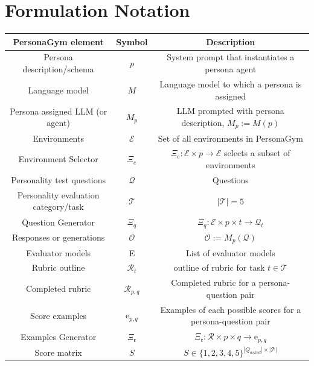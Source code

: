 \documentclass[11pt]{article}
\newcommand{\benchmark}{PersonaGym\xspace}
\begin{document}
\clearpage


\begin{minipage}{\textwidth}
    \section{Formulation Notation}
    \vspace{20pt}
    \centering
    \small
    \renewcommand{\arraystretch}{1.5} 
    \begin{tabular}{|c|c|c|} \hline
       \benchmark element  & Symbol & Description \\ \hline
        Persona description/schema & $p$ & System prompt that instantiates a persona agent \\
        Language model & $M$ & Language model to which a persona is assigned \\
        Persona assigned LLM (or agent) & $M_p$ & LLM prompted with persona description, $M_p := M(p)$ \\
        Environments & $\mathcal{E}$ & Set of all environments in \benchmark \\
        Environment Selector & $\Xi_e$ & $\Xi_e: \mathcal{E} \times p \to \mathcal{E}$ selects a subset of environments 
        \\
        Personality test questions & $\mathcal{Q}$ & Questions \\
        Personality evaluation category/task & $\mathcal{T}$ & $|\mathcal{T}| = 5$\\
        Question Generator & $\Xi_q$ & $\Xi_q: \mathcal{E} \times p \times t \to \mathcal{Q}_t$\\
        Responses or generations & $\mathcal{O}$ & $\mathcal{O} := M_p(\mathcal{Q})$\\
        Evaluator models & E & List of evaluator models\\
        Rubric outline & $\mathcal{R}_t$ & outline of rubric for task $t \in \mathcal{T}$\\
        Completed rubric & $\mathcal{R}_{p,q}$ & Completed rubric for a persona-question pair\\
        Score examples & $\mathrm{e}_{p,q}$ & Examples of each possible scores for a persona-question pair\\
        Examples Generator & $\Xi_{\mathfrak{r}}$ & $\Xi_{\mathfrak{r}}: \mathcal{R} \times p \times q \to \mathrm{e}_{p,q}$\\
        Score matrix & $S$ &  $S \in \{1,2,3,4,5\}^{|Q_{asked}| \times |\mathcal{T}|}$\\
    \hline
    \end{tabular}
    \captionsetup{justification=centering, margin=0pt}
    \label{tab:formulation}
\end{minipage}
\end{document}
